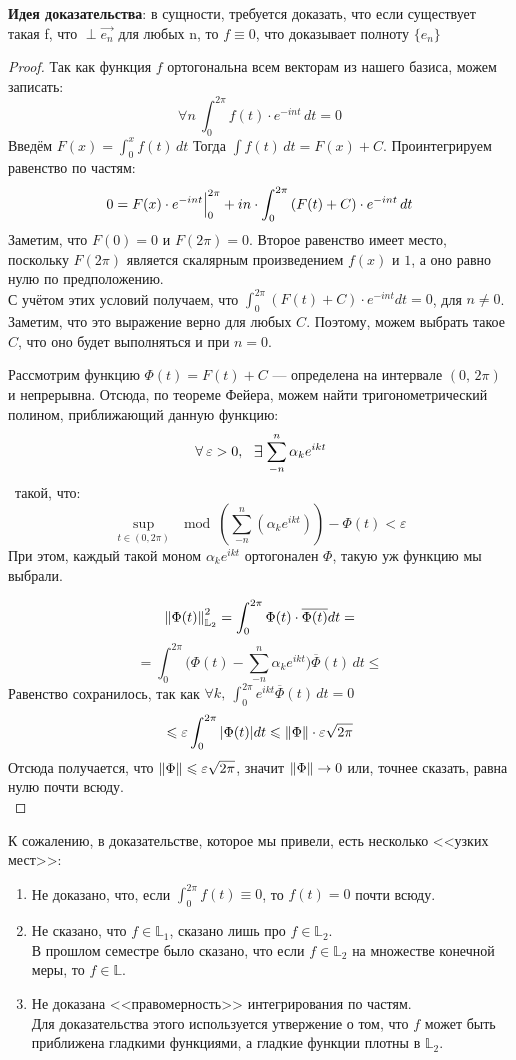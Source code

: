 \documentclass[12pt]{article}
\begin{document}
			\textbf{Идея доказательства}: в сущности, требуется доказать, что если существует такая f, что
			$\perp \vec{e_n}$
			для любых n, то $f \equiv 0$, что доказывает полноту $\{ e_n \}$
			\begin{proof}
				Так как функция $f$ ортогональна всем векторам из нашего базиса, можем записать:
				$$ \forall n ~ \int_0^{2\pi} f(t) \cdot e^{-int} \,dt = 0 $$
				Введём $F(x) = \int_0^x f(t) \,dt$ Тогда $\int f(t) \,dt = F(x) + C$. Проинтегрируем равенство по частям:
				$$ 0 = F(x) \cdot e^{-int} \Big|_{0}^{2\pi} 
			   + i n \cdot \int_0^{2\pi} \left(F(t) + C\right) \cdot e^{-int} \,dt $$
				Заметим, что $F(0) = 0$ и $F(2\pi) = 0$. Второе равенство имеет место, поскольку $F(2\pi)$ является 
			    скалярным произведением $f(x)$ и $1$, а оно равно нулю по предположению. \\
				С учётом этих условий получаем, что $\int_0^{2\pi} (F(t) + C) \cdot e^{-int} dt = 0$, для $n \neq 0$.
				Заметим, что это выражение верно для любых $C$. Поэтому, можем выбрать такое $C$, что оно будет
				выполняться и при $n = 0$.

				Рассмотрим функцию $\Phi(t) = F(t) + C$ --- определена на интервале $(0,\, 2\pi)$ и непрерывна.
				Отсюда, по теореме Фейера, можем найти тригонометрический полином, приближающий данную функцию:
				$$\forall \varepsilon > 0,\, \:\Exists\! \sum_{-n}^n \alpha_k e^{ikt}$$\
				такой, что:
				$$ \underset{t \in (0,2\pi)}{\sup} \mod{(\sum_{-n}^n (\alpha_k e^{ikt})) - \Phi(t)} < \varepsilon $$
				При этом, каждый такой моном $\alpha_k e^{ikt}$ ортогонален $\Phi$, такую уж функцию мы выбрали.
		
				$$ \left\| \Phi(t) \right\|^2_{\mathbb{L}_2} = \int_0^{2\pi} \Phi(t) \cdot \overline{\Phi(t)} dt = $$
				$$ = \int_0^{2\pi}\Big(\Phi(t) - \sum_{-n}^n \alpha_k e^{ikt}\Big)\overline{\Phi}(t) \,dt \leq $$
				\todo{что-то странное, обосновать}
				Равенство сохранилось, так как $\forall k,\: \int_0^{2\pi}e^{ikt}\overline{\Phi}(t) \,dt = 0$
				$$ \leqslant \varepsilon \int_0^{2\pi} | \Phi(t) | dt \leqslant \left\| \Phi \right\| \cdot \varepsilon\sqrt{2\pi} $$
				Отсюда получается, что $\left\| \Phi \right\| \leqslant \varepsilon \sqrt{2\pi}$, значит $\left\| \Phi \right\| \rightarrow 0$ или, точнее сказать,
				равна нулю почти всюду.\\
			\end{proof}
	
			К сожалению, в доказательстве, которое мы привели, есть несколько <<узких мест>>:
			\begin{enumerate}
				\item Не доказано, что, если $\int_0^{2\pi} f(t) \equiv 0$, то $f(t) = 0$ почти всюду.
				\item Не сказано, что $f \in \mathbb{L}_1$, сказано лишь про $f \in \mathbb{L}_2$. \\
				В прошлом семестре было сказано, что если $f \in \mathbb{L}_2$ на множестве конечной меры, то $f \in \mathbb{L}$.
				\item Не доказана <<правомерность>> интегрирования по частям. \\
				Для доказательства этого используется утвержение о том, что $f$ может быть приближена гладкими функциями, а
				гладкие функции плотны в $\mathbb{L}_2$.
			\end{enumerate}
\end{document}

